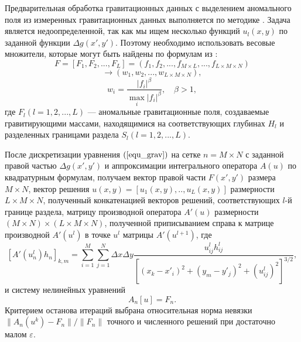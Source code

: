 Предварительная обработка гравитационных данных с выделением аномального поля из измеренных гравитационных данных выполняется по методике  \cite{MarPrut2003}. Задача является недоопределенной, так как мы ищем несколько функций $u_l(x,y)$ по заданной функции $\Delta g(x',y')$. Поэтому необходимо использовать весовые множители, которые могут быть найдены по формулам из \cite{AkMarMis2013}:
$$F=[F_1, F_2, ..., F_L]=(f_1, f_2, ..., f_{M\times L}, ..., f_{L\times M\times N})$$
$$\to (w_1, w_2, ..., w_{L\times M\times N}),$$
\begin{equation}\label{weght_fact_formula}
w_i=\frac{|f_i|^\beta}{\max\limits_{i} |f_i|^\beta}, \quad \beta>1,
\end{equation}
где $F_l (l=1, 2, ..., L)$ --- аномальные гравитационные поля, создаваемые гравитирующими массами, находящимися на соответствующих глубинах $H_l$ и разделенных границами раздела $S_l(l=1, 2, ..., L)$.

После дискретизации уравнения $(\ref{equ_grav})$ на сетке $n=M\times N$ с заданной правой частью $\Delta g(x',y')$ и аппроксимации интегрального оператора $A(u)$ по квадратурным формулам, получаем вектор правой части $F(x',y')$ размера  $M\times N$, вектор решения $u(x,y)=[u_1(x,y),..,u_L(x,y)]$ размерности $L\times M\times N$, полученный конкатенацией векторов решений, соответствующих $l$-й границе раздела, матрицу производной оператора $A'(u)$ размерности $(M\times N)\times(L\times M\times N)$, полученной приписыванием справа к матрице производной $A'(u^l)$ в точке $u^l$ матрицы $A'(u^{l+1})$, где
\begin{equation}\label{op_grav_disc_form_mult}
[A'(u_n^l)h_n]_{k,m}=\sum\limits_{i=1}^{M}\sum\limits_{j=1}^{N}
\Delta x\Delta y\frac{u^l_{ij}h^l_{ij}}{[(x_k-x'_i)^2+(y_m-y'_j)^2+(u^l_{ij})^2]^{3/2}},
\end{equation} и систему нелинейных уравнений  
\begin{equation}\label{snl_equ}
A_n[u]=F_n.
\end{equation}
Критерием останова итераций выбрана относительная норма невязки $\|A_n(u^k)-F_n\|/\|F_n\|$ точного и численного решений при достаточно малом $\varepsilon$.

